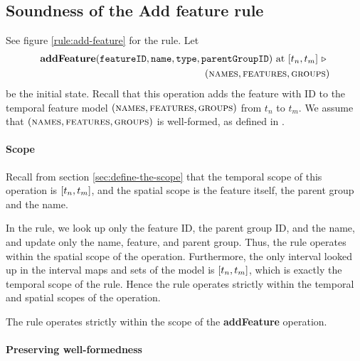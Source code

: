 \subsection{Soundness of the Add feature rule}
\label{sub:soundness-of-the-add-feature-rule}

See figure \vref{rule:add-feature} for the  rule.
Let 
\begin{equation*}
   \begin{split}
      \textbf{addFeature}(\var{featureID}, \var{name}, \var{type}, \var{parentGroupID})\text{ at }\interval{t_n}{t_m}
      \shove \\
   (\names{}, \features{}, \groups{})
\end{split}
\end{equation*}
be the initial state. Recall that this operation adds the feature with ID  to the temporal feature model $(\textsc{names}{}, \textsc{features}{}, \textsc{groups}{}{})$ from $t_n$ to $t_m$. We assume that $(\textsc{names}{}, \textsc{features}{}, \textsc{groups}{}{})$ is well-formed, as defined in .


\paragraph{Scope}

Recall from section \vref{sec:define-the-scope} that the temporal scope of this operation is $\interval{t_n}{t_m}$, and the spatial scope is the feature itself, the parent group and the name. 

In the rule, we look up only the feature ID, the parent group ID, and the name, and update only the name, feature, and parent group. Thus, the rule operates within the spatial scope of the operation. Furthermore, the only interval looked up in the interval maps and sets of the model is $\interval{t_n}{t_m}$, which is exactly the temporal scope of the rule. Hence the rule operates strictly within the temporal and spatial scopes of the operation.
\\

\begin{lemma}
   The  rule operates strictly within the scope of the \textbf{addFeature} operation.
   \label{lemma:add-feature-scope}
\end{lemma}


\paragraph{Preserving well-formedness}

